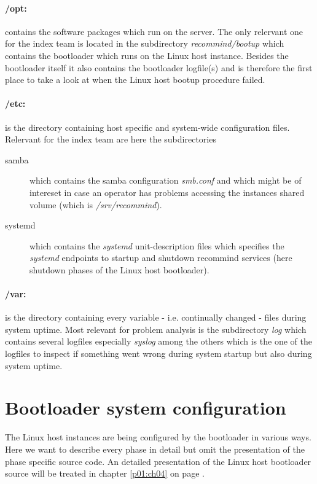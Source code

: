 	\paragraph{/opt:} contains the software packages which run on the server. The only relervant one for the index team is located in the subdirectory \emph{recommind/bootup} which contains the bootloader which runs on the Linux host instance. Besides the bootloader itself it also contains the bootloader logfile(s) and is therefore the first place to take a look at when the Linux host bootup procedure failed.
	
	\paragraph{/etc:} is the directory containing host specific and system-wide configuration files. Relervant for the index team are here the subdirectories
	\begin{description}
		\item[samba] which contains the samba configuration \emph{smb.conf} and which might be of intereset in case an operator has problems accessing the instances shared volume (which is \emph{/srv/recommind}).
		\item[systemd] which contains the \emph{systemd} unit-description files which specifies the \emph{systemd} endpoints to startup and shutdown recommind services (here shutdown phases of the Linux host bootloader).
	\end{description}
	
	\paragraph{/var:} is the directory containing every variable - i.e. continually changed - files during system uptime. Most relevant for problem analysis is the subdirectory \emph{log} which contains several logfiles especially \emph{syslog} among the others which is the one of the logfiles to inspect if something went wrong during system startup but also during system uptime.
	
	\section{Bootloader system configuration}
	The Linux host instances are being configured by the bootloader in various ways. Here we want to describe every phase in detail but omit the presentation of the phase specific source code. An detailed presentation of the Linux host bootloader source will be treated in chapter \ref{p01:ch04} on page \pageref{p01:ch04}.
	
